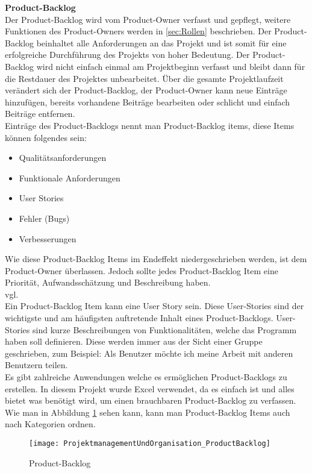 			\textbf{Product-Backlog} \\
				Der Product-Backlog wird vom Product-Owner verfasst und gepflegt, weitere Funktionen des Product-Owners werden in \ref{sec:Rollen} beschrieben. Der Product-Backlog beinhaltet alle Anforderungen an das Projekt und ist somit für eine erfolgreiche Durchführung des Projekts von hoher Bedeutung. Der Product-Backlog wird nicht einfach einmal am Projektbeginn verfasst und bleibt dann für die Restdauer des Projektes unbearbeitet. Über die gesamte Projektlaufzeit verändert sich der Product-Backlog, der Product-Owner kann neue Einträge hinzufügen, bereits vorhandene Beiträge bearbeiten oder schlicht und einfach Beiträge entfernen. \\
				Einträge des Product-Backlogs nennt man Product-Backlog items, diese Items können folgendes sein: 
				\begin{itemize}
					\item Qualitätsanforderungen
					\item Funktionale Anforderungen
					\item User Stories
					\item Fehler (Bugs)
					\item Verbesserungen
				\end{itemize}
				Wie diese Product-Backlog Items im Endeffekt niedergeschrieben werden, ist dem Product-Owner überlassen. Jedoch sollte jedes Product-Backlog Item eine Priorität, Aufwandsschätzung und Beschreibung haben.\\ vgl.\textcite{ScrumProduct-Backlog} \\
				Ein Product-Backlog Item kann eine User Story sein. Diese User-Stories sind der wichtigste und am häufigsten auftretende Inhalt eines Product-Backlogs. User-Stories sind kurze Beschreibungen von Funktionalitäten, welche das Programm haben soll definieren. Diese werden immer aus der Sicht einer Gruppe geschrieben, zum Beispiel: Als Benutzer möchte ich meine Arbeit mit anderen Benutzern teilen. \\
				Es gibt zahlreiche Anwendungen welche es ermöglichen Product-Backlogs zu erstellen. In diesem Projekt wurde Excel verwendet, da es einfach ist und alles bietet was benötigt wird, um einen brauchbaren Product-Backlog zu verfassen. Wie man in Abbildung \ref{fig:productBacklog} sehen kann, kann man Product-Backlog Items auch nach Kategorien ordnen. \\
\begin{figure}[H]	
	\texttt{[image: ProjektmanagementUndOrganisation\_ProductBacklog]}
    \caption{Product-Backlog}
    \label{fig:productBacklog}
\end{figure}
				
